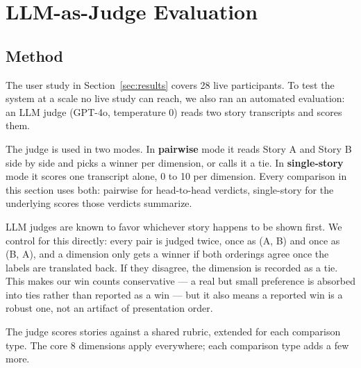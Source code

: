 \documentclass[10pt]{article}
\begin{document}
\section{LLM-as-Judge Evaluation}
\label{sec:llm-judge}

\subsection{Method}
\label{sec:llm-judge-method}

The user study in Section~\ref{sec:results} covers 28 live participants. To test the system at a scale no live study can reach, we also ran an automated evaluation: an LLM judge (GPT-4o, temperature 0) reads two story transcripts and scores them.

The judge is used in two modes. In \textbf{pairwise} mode it reads Story A and Story B side by side and picks a winner per dimension, or calls it a tie. In \textbf{single-story} mode it scores one transcript alone, 0 to 10 per dimension. Every comparison in this section uses both: pairwise for head-to-head verdicts, single-story for the underlying scores those verdicts summarize.

LLM judges are known to favor whichever story happens to be shown first. We control for this directly: every pair is judged twice, once as (A, B) and once as (B, A), and a dimension only gets a winner if both orderings agree once the labels are translated back. If they disagree, the dimension is recorded as a tie. This makes our win counts conservative — a real but small preference is absorbed into ties rather than reported as a win — but it also means a reported win is a robust one, not an artifact of presentation order.

The judge scores stories against a shared rubric, extended for each comparison type. The core 8 dimensions apply everywhere; each comparison type adds a few more.
\end{document}
